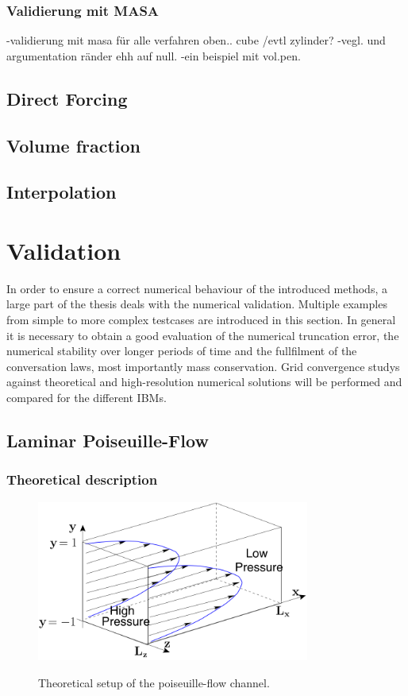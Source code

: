\subsubsection{Validierung mit MASA}
-validierung mit masa für alle verfahren oben.. cube /evtl zylinder?
-vegl. und argumentation ränder ehh auf null.
-ein beispiel mit vol.pen.

\subsection{Direct Forcing}
\subsection{Volume fraction}
\subsection{Interpolation}
\newpage

\section{Validation}

In order to ensure a correct numerical behaviour of the introduced methods,
a large part of the thesis deals with the numerical validation.
Multiple examples from simple to more complex testcases are introduced in this section.
In general it is necessary to obtain a good evaluation of the numerical truncation error, the numerical stability over longer periods of time
and the fullfilment of the conversation laws, most importantly mass conservation.
Grid convergence studys against theoretical and high-resolution numerical solutions  will be performed
and compared for the different IBMs.


\subsection{Laminar Poiseuille-Flow}
\subsubsection{Theoretical description}

\begin{figure}[!bp]
  \centering
  \includegraphics[width=0.8\textwidth]{gfx/immersed_boundary/val_volpen/poiseuilleflow.png}\label{b}
  \caption{Theoretical setup of the poiseuille-flow channel.}
\end{figure}


